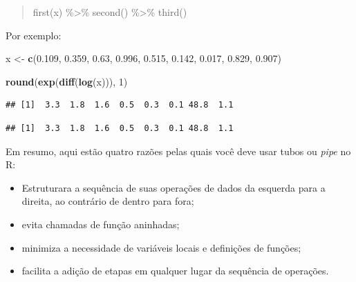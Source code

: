 \documentclass[]{book}
\newenvironment{Shaded}{\begin{snugshade}}{\end{snugshade}}
\newcommand{\CommentTok}[1]{\textcolor[rgb]{0.56,0.35,0.01}{\textit{#1}}}
\newcommand{\DecValTok}[1]{\textcolor[rgb]{0.00,0.00,0.81}{#1}}
\newcommand{\FloatTok}[1]{\textcolor[rgb]{0.00,0.00,0.81}{#1}}
\newcommand{\KeywordTok}[1]{\textcolor[rgb]{0.13,0.29,0.53}{\textbf{#1}}}
\newcommand{\NormalTok}[1]{#1}
\newcommand{\OperatorTok}[1]{\textcolor[rgb]{0.81,0.36,0.00}{\textbf{#1}}}
\newcommand{\StringTok}[1]{\textcolor[rgb]{0.31,0.60,0.02}{#1}}
\begin{document}
\begin{quote}
first(x) \%\textgreater\% second() \%\textgreater\% third()
\end{quote}

Por exemplo:

\begin{Shaded}
\begin{Highlighting}[]
\NormalTok{x <-}\StringTok{ }\KeywordTok{c}\NormalTok{(}\FloatTok{0.109}\NormalTok{, }\FloatTok{0.359}\NormalTok{, }\FloatTok{0.63}\NormalTok{, }\FloatTok{0.996}\NormalTok{, }\FloatTok{0.515}\NormalTok{, }\FloatTok{0.142}\NormalTok{, }\FloatTok{0.017}\NormalTok{, }\FloatTok{0.829}\NormalTok{, }\FloatTok{0.907}\NormalTok{)}

\KeywordTok{round}\NormalTok{(}\KeywordTok{exp}\NormalTok{(}\KeywordTok{diff}\NormalTok{(}\KeywordTok{log}\NormalTok{(x))), }\DecValTok{1}\NormalTok{)}
\end{Highlighting}
\end{Shaded}

\begin{verbatim}
## [1]  3.3  1.8  1.6  0.5  0.3  0.1 48.8  1.1
\end{verbatim}

\begin{Shaded}
\end{Shaded}

\begin{verbatim}
## [1]  3.3  1.8  1.6  0.5  0.3  0.1 48.8  1.1
\end{verbatim}

Em resumo, aqui estão quatro razões pelas quais você deve usar tubos ou \emph{pipe} no R:

\begin{itemize}
\item
  Estruturara a sequência de suas operações de dados da esquerda para a direita, ao contrário de dentro para fora;
\item
  evita chamadas de função aninhadas;
\item
  minimiza a necessidade de variáveis locais e definições de funções;
\item
  facilita a adição de etapas em qualquer lugar da sequência de operações.
\end{itemize}
\end{document}
